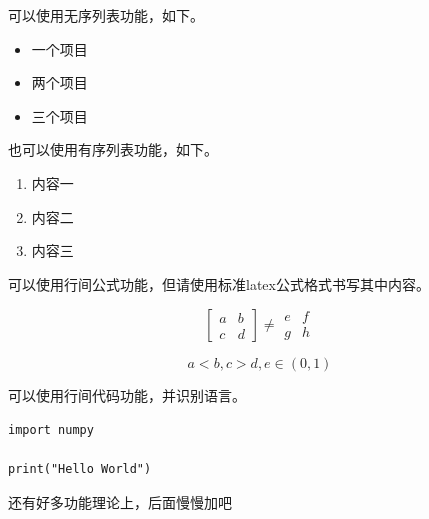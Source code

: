 可以使用无序列表功能，如下。

\begin{itemize}
    \item 一个项目
    \item 两个项目
    \item 三个项目
\end{itemize}

也可以使用有序列表功能，如下。

\begin{enumerate}
    \item 内容一
    \item 内容二
    \item 内容三
\end{enumerate}

可以使用行间公式功能，但请使用标准latex公式格式书写其中内容。

\begin{equation}
    \begin{bmatrix}
    a & b \\ c & d
    \end{bmatrix}
    \neq
    \begin{matrix}
    e & f \\ g & h
    \end{matrix}
    \label{eq:1}
\end{equation}

\begin{equation}
    a<b, c>d, e\in (0,1)
\end{equation}

可以使用行间代码功能，并识别语言。

\begin{verbatim}
import numpy

print("Hello World")
\end{verbatim}

还有好多功能理论上，后面慢慢加吧


